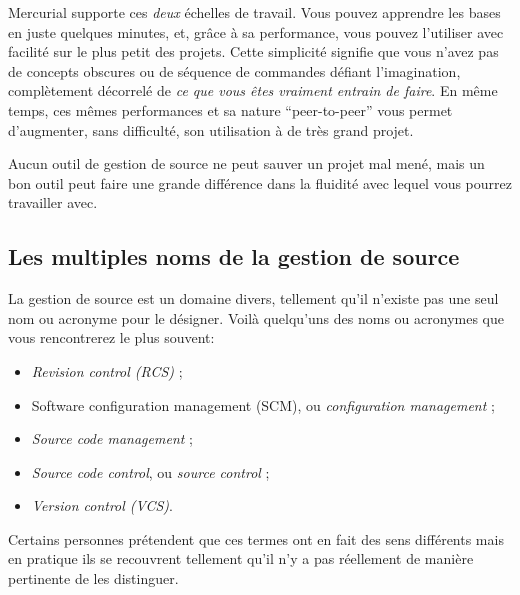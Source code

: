 Mercurial supporte ces \emph{deux} échelles de travail. Vous pouvez apprendre
les bases en juste quelques minutes, et, grâce à sa performance, vous pouvez
l'utiliser avec facilité sur le plus petit des projets. Cette simplicité 
signifie que vous n'avez pas de concepts obscures ou de séquence de commandes
défiant l'imagination, complètement décorrelé de \emph{ce que vous êtes 
vraiment entrain de faire}. En même temps, ces mêmes performances et sa 
nature ``peer-to-peer'' vous permet d'augmenter, sans difficulté, son 
utilisation à de très grand projet.

Aucun outil de gestion de source ne peut sauver un projet mal mené, mais un
bon outil peut faire une grande différence dans la fluidité avec lequel 
vous pourrez travailler avec.

\subsection{Les multiples noms de la gestion de source}

La gestion de source est un domaine divers, tellement qu'il n'existe pas
une seul nom ou acronyme pour le désigner. Voilà quelqu'uns des noms ou 
acronymes que vous rencontrerez le plus souvent:
\begin{itemize}
\item \textit{Revision control (RCS)} ;
\item Software configuration management (SCM), ou \textit{configuration management} ;
\item \textit{Source code management} ;
\item \textit{Source code control}, ou \textit{source control} ;
\item \textit{Version control (VCS)}.
\end{itemize}


Certains personnes prétendent que ces termes ont en fait des sens
différents mais en pratique ils se recouvrent tellement qu'il n'y a pas
réellement de manière pertinente de les distinguer.


